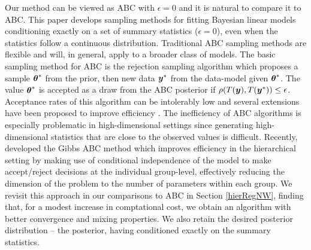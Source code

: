 \documentclass[ba]{imsart}
\def\bth{\mbox{\boldmath $\theta$}}
\newcommand{\by}{\mbox{\boldmath $y$}}
\newcommand{\bz}{\mbox{\boldmath $z$}}
\begin{document}
Our method can be viewed as ABC with $\epsilon = 0$ and it is natural to compare it to ABC. This paper develops sampling methods for fitting Bayesian linear models conditioning exactly on a set of summary statistics ($\epsilon = 0$), even when the statistics follow a continuous distribution. Traditional ABC sampling methods are flexible and will, in general, apply to a broader class of models. The basic sampling method for ABC is the rejection sampling algorithm \citep{pritchard1999} which proposes a sample $\bth^{*}$ from the prior, then new data $\by^{*}$ from the data-model given $\bth^{*}$. The value $\bth^{*}$ is accepted as a draw from the ABC posterior if $\rho(T(\by),T(\by^{*})) \leq \epsilon$. Acceptance rates of this algorithm can be intolerably low and several extensions have been proposed to improve efficiency \citep[see, for example,][]{beaumont2009, turner2012}. The inefficiency of ABC algorithms is especially problematic in high-dimensional settings since generating high-dimensional statistics that are close to the observed values is difficult. Recently, \cite{turner2014} developed the Gibbs ABC method which improves efficiency in the hierarchical setting by making use of conditional independence of the model to make accept/reject decisions at the individual group-level, effectively reducing the dimension of the problem to the number of parameters within each group. We revisit this approach in our comparisons to ABC in Section \ref{hierRegNW}, finding that, for a modest increase in comptational cost, we obtain an algorithm with better convergence and mixing properties.  We also retain the desired posterior distribution -- the posterior, having conditioned exactly on the summary statistics.


\end{document}
